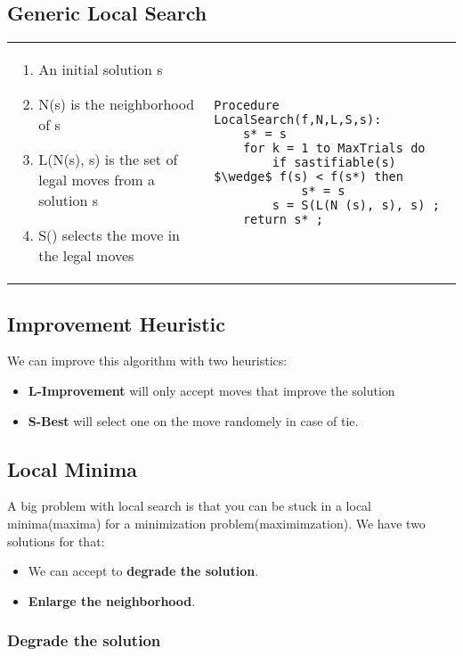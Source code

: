 
\subsection{Generic Local Search}
\begin{tabular}{m{9cm}m{6cm}}
\begin{enumerate}
    \item An initial solution s
    \item N(s) is the neighborhood of s
    \item L(N(s), s) is the set of legal moves from a solution s
    \item S() selects the move in the legal moves
\end{enumerate}
&
\begin{lstlisting}[mathescape]
Procedure LocalSearch(f,N,L,S,s):
    s* = s
    for k = 1 to MaxTrials do
        if sastifiable(s) $\wedge$ f(s) < f(s*) then
            s* = s
        s = S(L(N (s), s), s) ;
    return s* ;
\end{lstlisting}
\end{tabular}

\subsection{Improvement Heuristic}
We can improve this algorithm with two heuristics:
\begin{itemize}
    \item  \textbf{L-Improvement} will only accept moves that improve the solution
    \item \textbf{S-Best} will select one on the move randomely in case of tie.
\end{itemize}

\subsection{Local Minima}

A big problem with local search is that you can be stuck in a local minima(maxima) for a minimization problem(maximimzation).
We have two solutions for that:
\begin{itemize}
    \item We can accept to \textbf{degrade the solution}.
    \item \textbf{Enlarge the neighborhood}.
\end{itemize}

\subsubsection{Degrade the solution}

